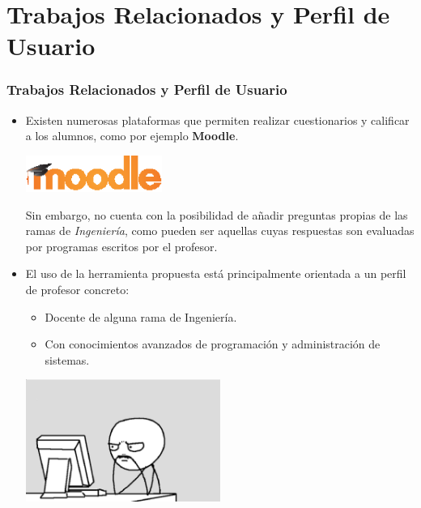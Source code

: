 \documentclass{beamer}
\begin{document}
\section{Trabajos Relacionados y Perfil de Usuario}
\begin{frame}[allowframebreaks]
  \frametitle{Trabajos Relacionados y Perfil de Usuario}
  
  \begin{itemize}
    \item Existen numerosas plataformas que permiten realizar cuestionarios y calificar a los alumnos, como por ejemplo {\bfseries Moodle}.
    \begin{center}
      \includegraphics[width=0.35\textwidth]{img/moodle.eps}
    \end{center}
    Sin embargo, no cuenta con la posibilidad de añadir preguntas propias de las ramas de \textit{Ingeniería}, como pueden ser aquellas
    cuyas respuestas son evaluadas por programas escritos por el profesor.
    \framebreak
    
    \item El uso de la herramienta propuesta está principalmente orientada a un perfil de profesor concreto:
    \begin{itemize}
      \item Docente de alguna rama de Ingeniería.
      \item Con conocimientos avanzados de programación y administración de sistemas.
    \end{itemize}
    
    \begin{center}
      \includegraphics[width=0.5\textwidth]{img/meme.eps}
    \end{center}
  \end{itemize}
  
\end{frame}
\end{document}
